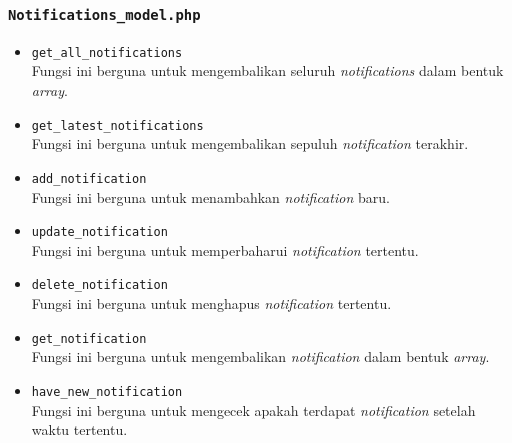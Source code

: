 \subsubsection{\texttt{Notifications\_model.php}}
\begin{itemize}
	\item \texttt{get\_all\_notifications}\\
	Fungsi ini berguna untuk mengembalikan seluruh \textit{notifications} dalam bentuk \textit{array}.
	\item \texttt{get\_latest\_notifications}\\
	Fungsi ini berguna untuk mengembalikan sepuluh \textit{notification} terakhir.
	\item \texttt{add\_notification}\\
	Fungsi ini berguna untuk menambahkan \textit{notification} baru.
	\item \texttt{update\_notification}\\
	Fungsi ini berguna untuk memperbaharui \textit{notification} tertentu.
	\item \texttt{delete\_notification}\\
	Fungsi ini berguna untuk menghapus \textit{notification} tertentu.
	\item \texttt{get\_notification}\\
	Fungsi ini berguna untuk mengembalikan \textit{notification} dalam bentuk \textit{array}.
	\item \texttt{have\_new\_notification}\\
	Fungsi ini berguna untuk mengecek apakah terdapat \textit{notification} setelah waktu tertentu.
\end{itemize}

